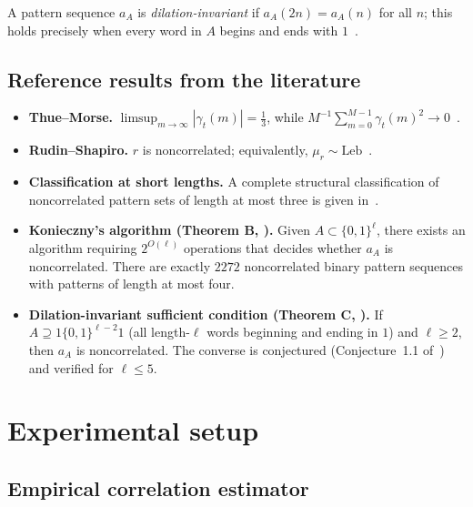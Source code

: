 \documentclass[11pt]{article}
\theoremstyle{definition}
\newcommand{\Leb}{\mathrm{Leb}}
\begin{document}
A pattern sequence $a_A$ is \emph{dilation-invariant} if $a_A(2n) = a_A(n)$
for all $n$; this holds precisely when every word in $A$ begins and ends
with $1$~\cite{Kon21}.

\subsection{Reference results from the literature}

\begin{itemize}[leftmargin=2em]
  \item \textbf{Thue--Morse.}
    $\limsup_{m \to \infty}|\gamma_t(m)| = \tfrac{1}{3}$, while
    $M^{-1}\sum_{m=0}^{M-1}\gamma_t(m)^2 \to 0$~\cite{Kon21}.

  \item \textbf{Rudin--Shapiro.}
    $r$ is noncorrelated; equivalently, $\mu_r \sim \Leb$~\cite{Kon21,ZPK18}.

  \item \textbf{Classification at short lengths.}
    A complete structural classification of noncorrelated pattern sets
    of length at most three is given in~\cite{ZPK18}.

  \item \textbf{Konieczny's algorithm (Theorem B, \cite{Kon21}).}
    Given $A \subset \{0,1\}^\ell$, there exists an algorithm requiring
    $2^{O(\ell)}$ operations that decides whether $a_A$ is noncorrelated.
    There are exactly $2272$ noncorrelated binary pattern sequences with
    patterns of length at most four.

  \item \textbf{Dilation-invariant sufficient condition (Theorem C, \cite{Kon21}).}
    If $A \supseteq 1\{0,1\}^{\ell-2}1$ (all length-$\ell$ words beginning
    and ending in $1$) and $\ell \geq 2$, then $a_A$ is noncorrelated.
    The converse is conjectured (Conjecture~1.1 of~\cite{Kon21}) and
    verified for $\ell \leq 5$.
\end{itemize}

\section{Experimental setup}
\label{sec:setup}

\subsection{Empirical correlation estimator}
\end{document}
